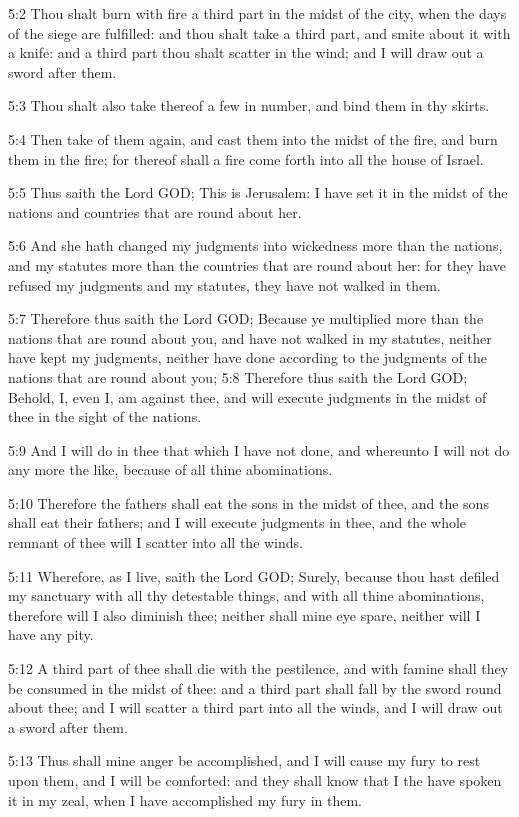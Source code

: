 5:2 Thou shalt burn with fire a third part in the midst of the city, when the days of the siege are fulfilled: and thou shalt take a third part, and smite about it with a knife: and a third part thou shalt scatter in the wind; and I will draw out a sword after them.

5:3 Thou shalt also take thereof a few in number, and bind them in thy skirts.

5:4 Then take of them again, and cast them into the midst of the fire, and burn them in the fire; for thereof shall a fire come forth into all the house of Israel.

5:5 Thus saith the Lord GOD; This is Jerusalem: I have set it in the midst of the nations and countries that are round about her.

5:6 And she hath changed my judgments into wickedness more than the nations, and my statutes more than the countries that are round about her: for they have refused my judgments and my statutes, they have not walked in them.

5:7 Therefore thus saith the Lord GOD; Because ye multiplied more than the nations that are round about you, and have not walked in my statutes, neither have kept my judgments, neither have done according to the judgments of the nations that are round about you; 5:8 Therefore thus saith the Lord GOD; Behold, I, even I, am against thee, and will execute judgments in the midst of thee in the sight of the nations.

5:9 And I will do in thee that which I have not done, and whereunto I will not do any more the like, because of all thine abominations.

5:10 Therefore the fathers shall eat the sons in the midst of thee, and the sons shall eat their fathers; and I will execute judgments in thee, and the whole remnant of thee will I scatter into all the winds.

5:11 Wherefore, as I live, saith the Lord GOD; Surely, because thou hast defiled my sanctuary with all thy detestable things, and with all thine abominations, therefore will I also diminish thee; neither shall mine eye spare, neither will I have any pity.

5:12 A third part of thee shall die with the pestilence, and with famine shall they be consumed in the midst of thee: and a third part shall fall by the sword round about thee; and I will scatter a third part into all the winds, and I will draw out a sword after them.

5:13 Thus shall mine anger be accomplished, and I will cause my fury to rest upon them, and I will be comforted: and they shall know that I the \LORD have spoken it in my zeal, when I have accomplished my fury in them.

